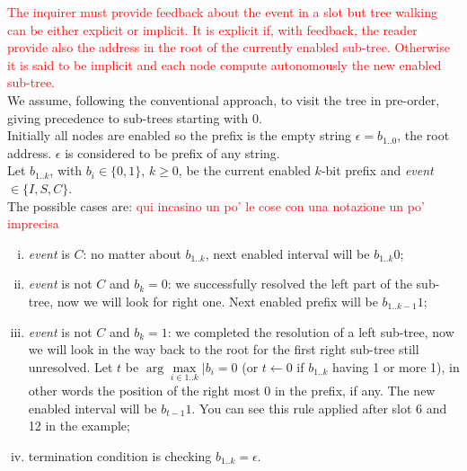 \documentclass[12pt,a4paper,twocolumns]{report}
\begin{document}
\textcolor{red}{
The inquirer must provide feedback about the event in a slot but tree walking can be either explicit or implicit. It is explicit if, with feedback, the reader provide also the address in the root of the currently enabled sub-tree. Otherwise it is said to be implicit and each node compute autonomously the new enabled sub-tree.}\\
We assume, following the conventional approach, to visit the tree in pre-order, giving precedence to sub-trees starting with 0.\\
Initially all nodes are enabled so the prefix is the empty string $\epsilon=b_{1..0}$, the root address. $\epsilon$ is considered to be prefix of any string.\\
Let $b_{1..k}$, with $b_{i} \in \{0,1\}$, $k \geq0$, be the current enabled $k$-bit prefix and \emph{event} $\in \{I,S,C\}$.\\
The possible cases are: \textcolor{red}{qui incasino un po' le cose con una notazione un po' imprecisa}
\begin{enumerate}[i.]
\item \emph{event} is $C$: no matter about $b_{1..k}$, next enabled interval will be $b_{1..k}0$;
\item \emph{event} is not $C$ and $b_{k}=0$: we successfully resolved the left part of the sub-tree, now we will look for right one. Next enabled prefix will be $b_{1..k-1}1$;
\item \emph{event} is not $C$ and $b_{k}=1$: we completed the  resolution of a left sub-tree, now we will look in the way back to the root for the first right sub-tree still unresolved. Let $t$ be $ \arg\underset{i \in 1..k}{\max}|b_{i}=0$ (or $t\gets 0$ if $b_{1..k}$ having 1 or more 1), in other words the position of the right most 0 in the prefix, if any. The new enabled interval will be $b_{t-1}1$. You can see this rule applied after slot 6 and 12 in the example;
\item termination condition is checking $b_{1..k}=\epsilon$.
\end{enumerate}
\end{document}
